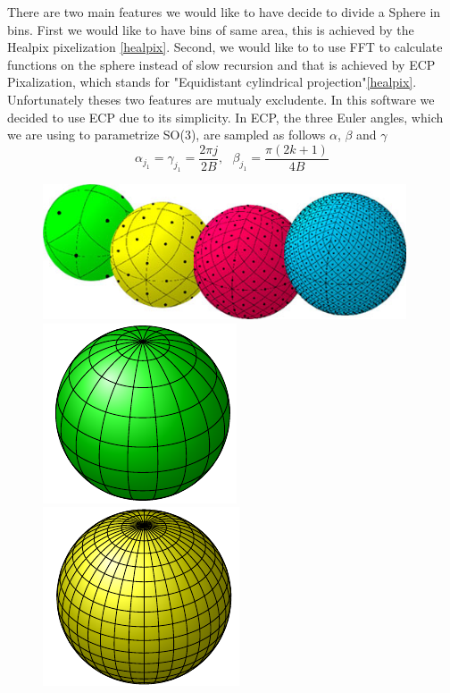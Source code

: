 \documentclass[12pt]{article}
\begin{document}
There are two main features we would like to have decide to divide a Sphere in
bins. First we would like to have bins of same area, this is achieved by the
Healpix pixelization \ref{healpix}. Second, we would like to to use FFT to calculate
functions on the sphere instead of slow recursion and that is achieved by ECP
Pixalization, which stands for "Equidistant cylindrical projection"\ref{healpix}.
Unfortunately theses two features are mutualy excludente. In this software we
decided to use ECP due to its simplicity. In ECP, the three Euler angles, which we 
are using to parametrize SO(3), are sampled as follows
$\alpha$, $\beta$ and $\gamma$
\begin{equation}
\alpha_{j_1} = \gamma_{j_1} = \frac{2\pi j}{2B}, \ \ \ \beta_{j_1} = \frac{\pi(2k + 1)}{4B}
\nonumber
\end{equation}
\begin{figure}[ht]
   \centering
      \includegraphics[height=4cm,width=10.78cm,angle=0]{healpixGridRefinement.jpg} \\
      \includegraphics[]{cylindrical-f1.pdf}
      \includegraphics[]{cylindrical-f2.pdf}

\end{figure}
\end{document}
